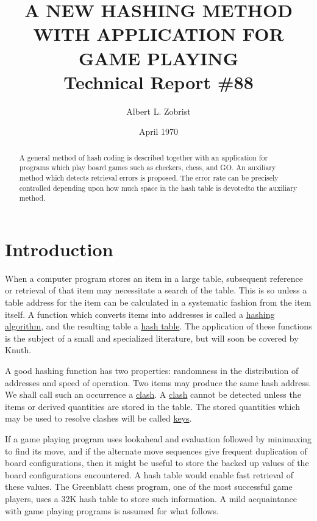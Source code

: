 \documentclass{article}
\date{April 1970}
\begin{document}
\title{A NEW HASHING METHOD WITH APPLICATION FOR GAME PLAYING\\ {\small Technical Report \#88}}
\author{Albert L. Zobrist}
\maketitle

\begin{abstract}
A general method of hash coding is described together with an application for
programs which play board games such as checkers, chess, and GO. An auxiliary
method which detects retrieval errors is proposed. The error rate can be
precisely controlled depending upon how much space in the hash table is
devotedto the auxiliary method.
\end{abstract}

\section*{Introduction}

When a computer program stores an item in a large table, subsequent reference
or retrieval of that item may necessitate a search of the table. This is so
unless a table address for the item can be calculated in a systematic fashion
from the item itself. A function which converts items into addresses is called
a \underline{hashing algorithm}, and the resulting table a \underline{hash
table}. The application of these functions is the subject of a small and
specialized literature, but will soon be covered by Knuth\cite{knuth}.

A good hashing function has two properties: randomness in the distribution of
addresses and speed of operation. Two items may produce the same hash address.
We shall call such an occurrence a \underline{clash}. A \underline{clash}
cannot be detected unless the items or derived quantities are stored in the
table. The stored quantities which may be used to resolve clashes will be called
\underline{keys}.

If a game playing program uses lookahead and evaluation followed by minimaxing
to find its move, and if the alternate move sequences give frequent duplication
of board configurations, then it might be useful to store the backed up values
of the board configurations encountered. A hash table would enable fast
retrieval of these values. The Greenblatt chess program\cite{greenblatt}, one
of the most successful game players, uses a 32K hash table to store such
information. A mild acquaintance with game playing programs is assumed for what
follows.
\end{document}
